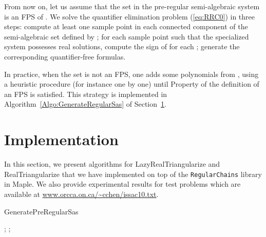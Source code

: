 \documentclass{sig-alternate}
\def\S {\ensuremath{\mathfrak{S}}}
\newcommand{\GeneratePreRegularSas}[1]{\mbox{{\sf GeneratePreRegularSas}}}
\begin{document}
From now on, 
let us assume that the set  in 
the pre-regular semi-algebraic system 
is an {\small FPS} of .
We solve the quantifier elimination problem (\ref{eq:RRC0})
in three steps:
 compute at least one sample point in each connected component of 
the semi-algebraic set defined by ;
 for each sample point  such that 
the specialized system  possesses 
real solutions, compute the sign
of  for each ;
 generate the corresponding quantifier-free formulas.

In practice, when the set  is not an {\small FPS}, 
one adds some polynomials from ,
using a heuristic procedure (for instance one by one)  
until Property  of the definition of an {\small FPS} is
satisfied.
This strategy is implemented in Algorithm~\ref{Algo:GenerateRegularSas}
of Section~\ref{sect:Algorithm}.


\section{Implementation}
\label{sect:Algorithm}
In this section, we present algorithms for {\sf LazyRealTriangularize}
and  {\sf RealTriangularize} that we have implemented 
on top of the {\tt RegularChains} library in {\sc Maple}.
We also provide experimental results
for test problems which are available at
\url{www.orcca.on.ca/~cchen/issac10.txt}.

\begin{algorithm}
\dontprintsemicolon
\linesnumbered
\caption{\GeneratePreRegularSas{\S}\label{Algo:GeneratePreRegularSas}}
; \; 
    ; \;
    \For{}{
        \For{}{
            \For{}{
                \eIf{}{
                     
                   }{
                     
                }
            }
        }
        ; \;
    }
    \;
\end{algorithm}
\end{document}
